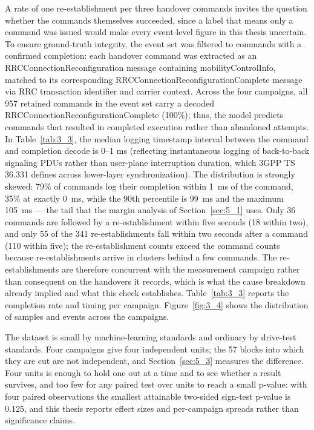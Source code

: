 A rate of one re-establishment per three handover commands invites the question whether the commands themselves succeeded, since a label that means only a command was issued would make every event-level figure in this thesis uncertain. To ensure ground-truth integrity, the event set was filtered to commands with a confirmed completion: each handover command was extracted as an RRCConnectionReconfiguration message containing mobilityControlInfo, matched to its corresponding RRCConnectionReconfigurationComplete message via RRC transaction identifier and carrier context. Across the four campaigns, all 957 retained commands in the event set carry a decoded RRCConnectionReconfigurationComplete (100\%); thus, the model predicts commands that resulted in completed execution rather than abandoned attempts. In Table~\ref{tab:3_3}, the median logging timestamp interval between the command and completion decode is 0--1 ms (reflecting instantaneous logging of back-to-back signaling PDUs rather than user-plane interruption duration, which 3GPP TS 36.331 defines across lower-layer synchronization). The distribution is strongly skewed: 79\% of commands log their completion within 1~ms of the command, 35\% at exactly 0~ms, while the 90th percentile is 99~ms and the maximum 105~ms --- the tail that the margin analysis of Section~\ref{sec:5_1} uses. Only 36 commands are followed by a re-establishment within five seconds (18 within two), and only 55 of the 341 re-establishments fall within two seconds after a command (110 within five); the re-establishment counts exceed the command counts because re-establishments arrive in clusters behind a few commands. The re-establishments are therefore concurrent with the measurement campaign rather than consequent on the handovers it records, which is what the cause breakdown already implied and what this check establishes. Table~\ref{tab:3_3} reports the completion rate and timing per campaign. Figure~\ref{fig:3_4} shows the distribution of samples and events across the campaigns.

The dataset is small by machine-learning standards and ordinary by drive-test standards. Four campaigns give four independent units; the 57 blocks into which they are cut are not independent, and Section~\ref{sec:5_3} measures the difference. Four units is enough to hold one out at a time and to see whether a result survives, and too few for any paired test over units to reach a small p-value: with four paired observations the smallest attainable two-sided sign-test p-value is 0.125, and this thesis reports effect sizes and per-campaign spreads rather than significance claims.

